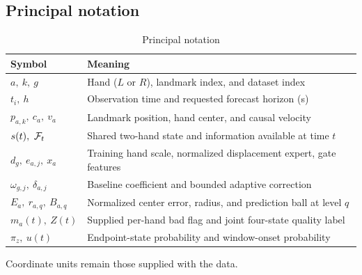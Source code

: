 \subsection{Principal notation}
\begin{table}[H]
\centering
\small
\caption{Principal notation}
\label{tab:notation}
\begin{tabularx}{\linewidth}{lX}
\toprule
Symbol & Meaning\\
\midrule
$a,\ k,\ g$ & Hand ($L$ or $R$), landmark index, and dataset index\\
$t_i,\ h$ & Observation time and requested forecast horizon (s)\\
$p_{a,k},\ c_a,\ v_a$ & Landmark position, hand center, and causal velocity\\
$s(t),\ \F_t$ & Shared two-hand state and information available at time $t$\\
$d_g,\ e_{a,j},\ x_a$ & Training hand scale, normalized displacement expert, gate features\\
$\omega_{g,j},\ \delta_{a,j}$ & Baseline coefficient and bounded adaptive correction\\
$E_a,\ r_{a,q},\ B_{a,q}$ & Normalized center error, radius, and prediction ball at level $q$\\
$m_a(t),\ Z(t)$ & Supplied per-hand bad flag and joint four-state quality label\\
$\pi_z,\ u(t)$ & Endpoint-state probability and window-onset probability\\
\bottomrule
\end{tabularx}
\end{table}
Coordinate units remain those supplied with the data.
